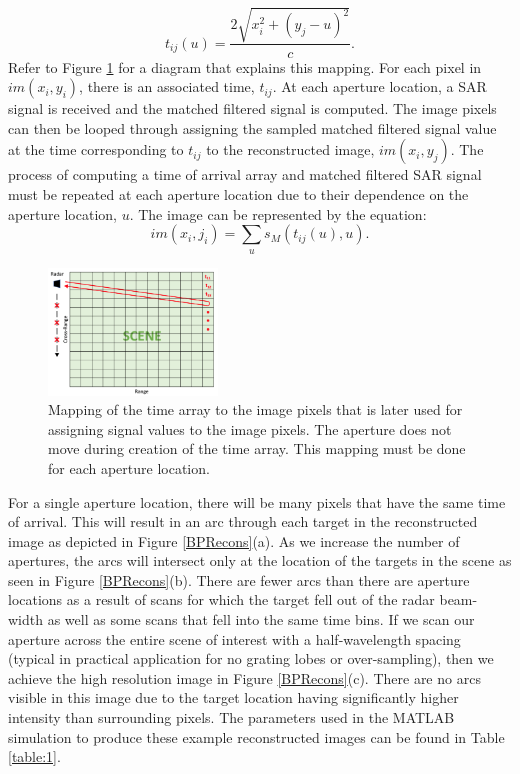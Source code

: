 \documentclass{article}
\begin{document}
\begin{equation}
\label{tof_array}
t_{ij}(u) = \frac{2\sqrt{x_i^2+(y_j-u)^2}}{c}.
\end{equation}
\newline
\indent
Refer to Figure \ref{SceneMap} for a diagram that explains this mapping. For each pixel in $im(x_i,y_i)$, there is an associated time, $t_{ij}$. At each aperture location, a SAR signal is received and the matched filtered signal is computed. The image pixels can then be looped through assigning the sampled matched filtered signal value at the time corresponding to $t_{ij}$ to the reconstructed image, $im(x_i,y_j)$. The process of computing a time of arrival array and matched filtered SAR signal must be repeated at each aperture location due to their dependence on the aperture location, $u$. The image can be represented by the equation:
\begin{equation}
\label{IM}
im(x_i,j_i) = \sum_{u}s_M(t_{ij}(u),u).
\end{equation}
\begin{figure}[h!]
    \centering
    \includegraphics[width=0.4\textwidth]{Figures/SceneMap.png}
\caption{Mapping of the time array to the image pixels that is later used for assigning signal values to the image pixels. The aperture does not move during creation of the time array. This mapping must be done for each aperture location.}
\label{SceneMap}
\end{figure}
\newline
\indent
For a single aperture location, there will be many pixels that have the same time of arrival. This will result in an arc through each target in the reconstructed image as depicted in Figure \ref{BPRecons}(a). As we increase the number of apertures, the arcs will intersect only at the location of the targets in the scene as seen in Figure \ref{BPRecons}(b). There are fewer arcs than there are aperture locations as a result of scans for which the target fell out of the radar beam-width as well as some scans that fell into the same time bins. If we scan our aperture across the entire scene of interest with a half-wavelength spacing (typical in practical application for no grating lobes or over-sampling), then we achieve the high resolution image in Figure \ref{BPRecons}(c). There are no arcs visible in this image due to the target location having significantly higher intensity than surrounding pixels. The parameters used in the MATLAB simulation to produce these example reconstructed images can be found in Table \ref{table:1}.
\end{document}
